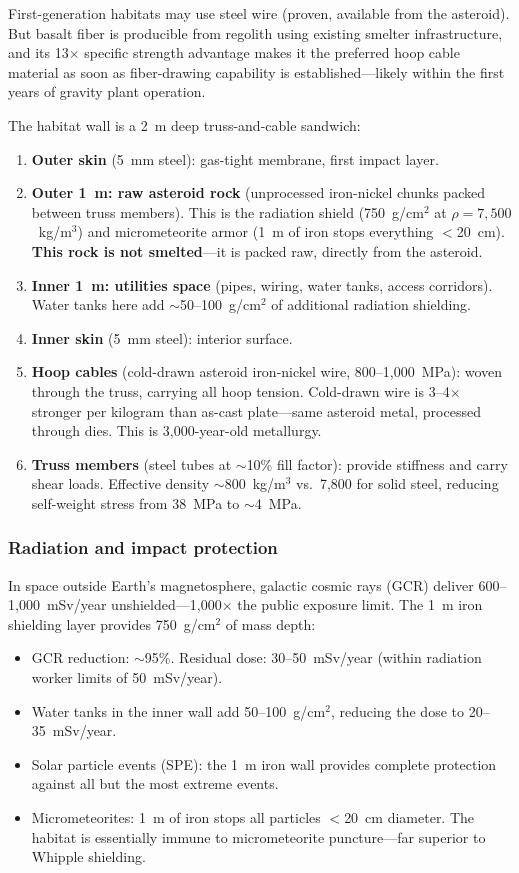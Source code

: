 \documentclass[12pt,letterpaper]{article}
\begin{document}
First-generation habitats may use steel wire (proven, available from the asteroid). But basalt fiber is producible from regolith using existing smelter infrastructure, and its 13$\times$ specific strength advantage makes it the preferred hoop cable material as soon as fiber-drawing capability is established---likely within the first years of gravity plant operation.

The habitat wall is a 2~m deep truss-and-cable sandwich:

\begin{enumerate}[label=(\roman*)]
\item \textbf{Outer skin} (5~mm steel): gas-tight membrane, first impact layer.
\item \textbf{Outer 1~m: raw asteroid rock} (unprocessed iron-nickel chunks packed between truss members). This is the radiation shield (750~g/cm$^2$ at $\rho = 7{,}500$~kg/m$^3$) and micrometeorite armor (1~m of iron stops everything $<$20~cm). \textbf{This rock is not smelted}---it is packed raw, directly from the asteroid.
\item \textbf{Inner 1~m: utilities space} (pipes, wiring, water tanks, access corridors). Water tanks here add $\sim$50--100~g/cm$^2$ of additional radiation shielding.
\item \textbf{Inner skin} (5~mm steel): interior surface.
\item \textbf{Hoop cables} (cold-drawn asteroid iron-nickel wire, 800--1,000~MPa): woven through the truss, carrying all hoop tension. Cold-drawn wire is 3--4$\times$ stronger per kilogram than as-cast plate---same asteroid metal, processed through dies. This is 3,000-year-old metallurgy.
\item \textbf{Truss members} (steel tubes at $\sim$10\% fill factor): provide stiffness and carry shear loads. Effective density $\sim$800~kg/m$^3$ vs.\ 7,800 for solid steel, reducing self-weight stress from 38~MPa to $\sim$4~MPa.
\end{enumerate}

\subsubsection{Radiation and impact protection}

In space outside Earth's magnetosphere, galactic cosmic rays (GCR) deliver 600--1,000~mSv/year unshielded---1,000$\times$ the public exposure limit. The 1~m iron shielding layer provides 750~g/cm$^2$ of mass depth:

\begin{itemize}
\item GCR reduction: $\sim$95\%. Residual dose: 30--50~mSv/year (within radiation worker limits of 50~mSv/year).
\item Water tanks in the inner wall add 50--100~g/cm$^2$, reducing the dose to 20--35~mSv/year.
\item Solar particle events (SPE): the 1~m iron wall provides complete protection against all but the most extreme events.
\item Micrometeorites: 1~m of iron stops all particles $<$20~cm diameter. The habitat is essentially immune to micrometeorite puncture---far superior to Whipple shielding.
\end{itemize}
\end{document}
